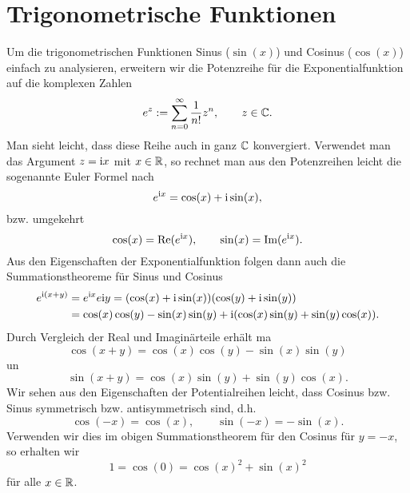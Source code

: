 \section{Trigonometrische Funktionen}
\label{\detokenize{stetigkeit/trig:trigonometrische-funktionen}}\label{\detokenize{stetigkeit/trig::doc}}
Um die trigonometrischen Funktionen Sinus (\(\sin(x)\)) und Cosinus (\(\cos(x)\)) einfach zu analysieren, erweitern wir die Potenzreihe für die Exponentialfunktion auf die komplexen Zahlen
\begin{equation*}
 e^z:= \sum_{n=0}^\infty \frac{1}{n!} z^n, \qquad z \in \mathbb{C}.
\end{equation*}
Man sieht leicht, dass diese Reihe auch in ganz \(\mathbb{C}\) konvergiert. Verwendet man das Argument \(z=\mathrm{i} x\) mit \(x \in \mathbb{R}\), so rechnet man aus den Potenzreihen leicht die sogenannte Euler Formel nach
\begin{equation*}
 e^{\mathrm{i} x} = \cos(x) + \mathrm{i} \sin(x),
\end{equation*}
bzw. umgekehrt
\begin{equation*}
 \cos(x) = \text{Re}(e^{\mathrm{i} x}), \qquad \sin(x) = \text{Im}(e^{\mathrm{i} x}).
\end{equation*}
Aus den Eigenschaften der Exponentialfunktion folgen dann auch die Summationstheoreme für Sinus und Cosinus
\begin{align*}
e^{\mathrm{i} (x+y)} &= e^{\mathrm{i} x}e{\mathrm{i} y} = (\cos(x) + \mathrm{i} \sin(x)) (\cos(y) + \mathrm{i} \sin(y))  \\
&= \cos(x) \cos(y) - \sin(x) \sin(y) + \mathrm{i} ( \cos(x) \sin(y) + \sin(y) \cos(x)).
\end{align*}
Durch Vergleich der Real  und Imaginärteile erhält ma
\begin{equation*}
 \cos(x+y) = \cos(x) \cos(y) - \sin(x) \sin(y)
\end{equation*}
un
\begin{equation*}
 \sin(x+y) =  \cos(x) \sin(y) + \sin(y) \cos(x).
\end{equation*}
Wir sehen aus den Eigenschaften der Potentialreihen leicht, dass Cosinus bzw. Sinus symmetrisch bzw. antisymmetrisch sind, d.h.
\begin{equation*}
 \cos(-x) = \cos(x)  , \qquad \sin(-x) = -\sin(x) .
\end{equation*}
Verwenden wir dies im obigen Summationstheorem für den Cosinus für \(y=-x\), so erhalten wir
\begin{equation*}
 1 = \cos(0) = \cos(x)^2 + \sin(x)^2
\end{equation*}
für alle \(x \in \mathbb{R}\).

